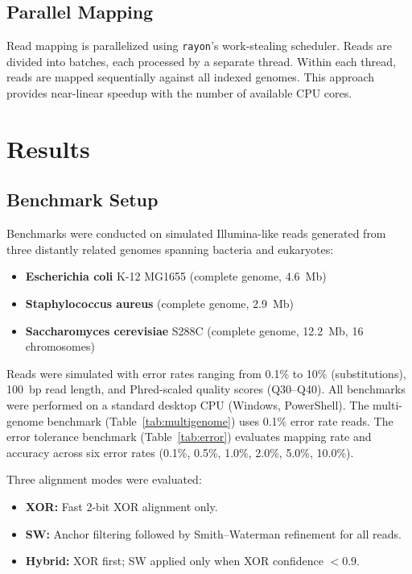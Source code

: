 \documentclass[10pt]{article}
\begin{document}
\subsection{Parallel Mapping}

Read mapping is parallelized using \texttt{rayon}'s work-stealing scheduler. Reads are divided into batches, each processed by a separate thread. Within each thread, reads are mapped sequentially against all indexed genomes. This approach provides near-linear speedup with the number of available CPU cores.

\section{Results}

\subsection{Benchmark Setup}

Benchmarks were conducted on simulated Illumina-like reads generated from three distantly related genomes spanning bacteria and eukaryotes:
\begin{itemize}
    \item \textbf{Escherichia coli} K-12 MG1655 (complete genome, 4.6~Mb)
    \item \textbf{Staphylococcus aureus} (complete genome, 2.9~Mb)
    \item \textbf{Saccharomyces cerevisiae} S288C (complete genome, 12.2~Mb, 16 chromosomes)
\end{itemize}

Reads were simulated with error rates ranging from 0.1\% to 10\% (substitutions), 100~bp read length, and Phred-scaled quality scores (Q30--Q40). All benchmarks were performed on a standard desktop CPU (Windows, PowerShell). The multi-genome benchmark (Table~\ref{tab:multigenome}) uses 0.1\% error rate reads. The error tolerance benchmark (Table~\ref{tab:error}) evaluates mapping rate and accuracy across six error rates (0.1\%, 0.5\%, 1.0\%, 2.0\%, 5.0\%, 10.0\%).

Three alignment modes were evaluated:
\begin{itemize}
    \item \textbf{XOR:} Fast 2-bit XOR alignment only.
    \item \textbf{SW:} Anchor filtering followed by Smith--Waterman refinement for all reads.
    \item \textbf{Hybrid:} XOR first; SW applied only when XOR confidence $< 0.9$.
\end{itemize}
\end{document}
